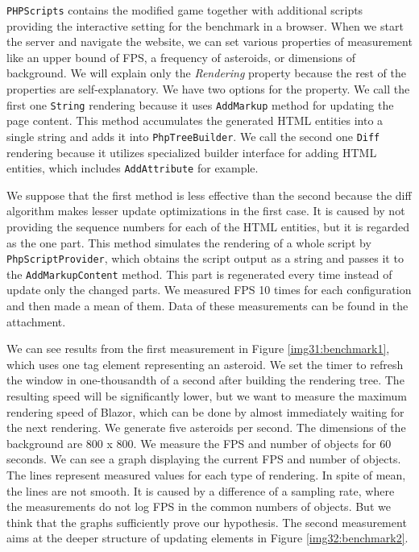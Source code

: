 \texttt{PHPScripts} contains the modified game together with additional scripts providing the interactive setting for the benchmark in a browser.
When we start the server and navigate the website, we can set various properties of measurement like an upper bound of FPS, a frequency of asteroids, or dimensions of background.
We will explain only the \textit{Rendering} property because the rest of the properties are self-explanatory.
We have two options for the property.
We call the first one \texttt{String} rendering because it uses \texttt{AddMarkup} method for updating the page content.
This method accumulates the generated HTML entities into a single string and adds it into \texttt{PhpTreeBuilder}.
We call the second one \texttt{Diff} rendering because it utilizes specialized builder interface for adding HTML entities, which includes \texttt{AddAttribute} for example.
\par
We suppose that the first method is less effective than the second because the diff algorithm makes lesser update optimizations in the first case.
It is caused by not providing the sequence numbers for each of the HTML entities, but it is regarded as the one part.
This method simulates the rendering of a whole script by \texttt{PhpScriptProvider}, which obtains the script output as a string and passes it to the \texttt{AddMarkupContent} method.
This part is regenerated every time instead of update only the changed parts.
We measured FPS 10 times for each configuration and then made a mean of them.
Data of these measurements can be found in the attachment.
\par
We can see results from the first measurement in Figure \ref{img31:benchmark1}, which uses one tag element representing an asteroid.
We set the timer to refresh the window in one-thousandth of a second after building the rendering tree.
The resulting speed will be significantly lower, but we want to measure the maximum rendering speed of Blazor, which can be done by almost immediately waiting for the next rendering. 
We generate five asteroids per second.
The dimensions of the background are 800 x 800.
We measure the FPS and number of objects for 60 seconds.
We can see a graph displaying the current FPS and number of objects.
The lines represent measured values for each type of rendering.
In spite of mean, the lines are not smooth.
It is caused by a difference of a sampling rate, where the measurements do not log FPS in the common numbers of objects.
But we think that the graphs sufficiently prove our hypothesis.
The second measurement aims at the deeper structure of updating elements in Figure \ref{img32:benchmark2}.

